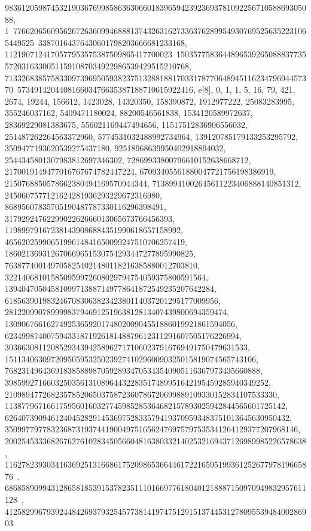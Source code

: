 {{{98361205987453219036769985863630660183965942392369378109225671058869305088, 1\
77662065609562672636099468881374326316273363762899549307695256352231065449525\
33870164376430601798203666681233168, 1121907124170577953575387509865417700023\
150357758364489653926508883773557203163300511591087034922986539429515210768, 
   71332683857583309739695059382375132881881703317877064894511623479694457370\
573491420440816603476635387188710615922416}}, 
 {e[8], {0, 1, 1, 5, 16, 79, 421, 2674, 19244, 156612, 1423028, 14320350, 
   158390872, 1912977222, 25083283995, 355246037162, 5409471180024, 
   88200546561838, 1534120589972637, 28369229081383675, 556021169447494656, 
   11517512836906556032, 251487262264563372960, 5774531032488992734964, 
   139120785179133253295792, 3509477193620539275437180, 
   92518968639950402918894032, 2544345801307983812697346302, 
   72869933800796610152638668712, 2170019149477016767674782447224, 
   67093405561880047721756198386919, 2150768850578662380494169570944344, 
   71389941002645611223406888140851312, 
   2450607577121624281936293229672316980, 
   86895607835705190487787330116296398491, 
   3179292476229902262666013065673766456393, 
   119899791672381439086884351990618657158992, 
   4656202599065199614841650099247510706257419, 
   186021369312670669651530754293447277895990825, 
   7638774001497058254021480118216385880012703810, 
   322140681015850959972608029794754059375800591564, 
   13940470504581099713887149778641872549235207642284, 
   618563901983246708306382342380114037201295177009956, 
   28122099078999983794691251963812813407439800694359474, 
   1309067661627492536592017480200904551886019921861594056, 
   62349987400759433187192618148879612311291607505176226994, 
   3036630811208529343942589627171060237916769491750479631533, 
   151134063097209505953250239274102960090325015819074565743106, 
   7682314964369183858898705928934705343540905116367973435660888, 
   398599271660325035613108964432283517489951642195459285940349252, 
   21098947726823578520650375872360786720699889109330152834107533330, 
   1138779671661759560160327745985285364682157893025942844565601725142, 
   62640739094612404528291453697528335794193709593483751013645630950432, 
   3509977977832368731937441900497516562476975797535341264129377207968146, 
   200254533368267627610283450566048163803321402532169437126989985226578638, 
   11627823930341636925131668617520986536644617221659519936125267797819665876\
, 
   686858909943128658185391537823511101669776180401218887150970949832957611128\
, 
   41258299679392448426937932545773814197475129151374453127809553948400286903\
}}}
